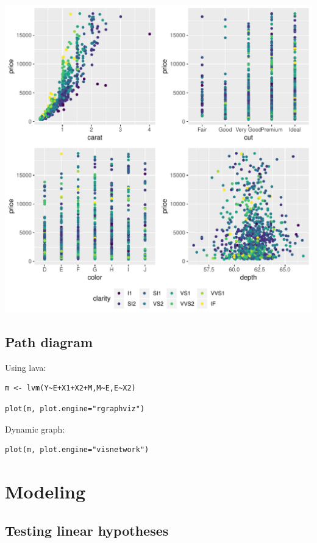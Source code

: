 \documentclass{article}
\begin{document}
\begin{center}
\includegraphics[width=.9\linewidth]{./figures/fig-combine.pdf}
\end{center}

\subsection{Path diagram}
\label{sec:org058c00e}
Using lava:
\lstset{language=r,label= ,caption= ,captionpos=b,numbers=none}
\begin{lstlisting}
m <- lvm(Y~E+X1+X2+M,M~E,E~X2)
\end{lstlisting}

\lstset{language=r,label= ,caption= ,captionpos=b,numbers=none}
\begin{lstlisting}
plot(m, plot.engine="rgraphviz")
\end{lstlisting}

Dynamic graph:
\lstset{language=r,label= ,caption= ,captionpos=b,numbers=none}
\begin{lstlisting}
plot(m, plot.engine="visnetwork")
\end{lstlisting}

\section{Modeling}
\label{sec:org32d16c6}
\subsection{Testing linear hypotheses}
\label{sec:org147deab}
\end{document}
